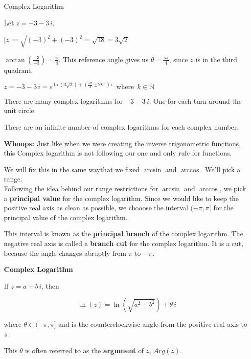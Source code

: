 \documentclass{ximera}
\begin{document}
\begin{example} Complex Logarithm


Let $z = -3 - 3 \, i$.


$|z| = \sqrt{(-3)^2 + (-3)^2} =  \sqrt{18} = 3 \sqrt{2}$


$\arctan\left(\frac{-3}{-3}\right) = \frac{\pi}{4}$.  This reference angle gives us $\theta = \frac{5 \pi}{4}$, since $z$ is in the third quadrant.




$z = -3 - 3 \, i =  e^{\ln(3 \sqrt{2}) + \left( \tfrac{5 \pi}{4} \pm 2 k \pi \right) \, i}     \, \text{ where } \, k \in \mathbb{N}  $


There are many complex logarithms for $-3 - 3 \, i$. One for each turn around the unit circle.



\end{example}




There are an infinite number of complex logarithms for each complex number.



\textbf{\textcolor{red!80!black}{Whoops: }}   Just like when we were creating the inverse trigonometric functions, this Complex logarithm is not following our one and only rule for functions.  

We will fix this in the same waythat we fixed $\arcsin$ and $\arccos$.  We'll pick a range. \\





Following the idea behind our range restrictions for $\arcsin$ and $\arccos$, we pick a \textbf{principal value} for the complex logarithm. Since we would like to keep the positive real axis as clean as possible, we chooose the interval $(-\pi, \pi]$ for the principal value of the complex logarithm.

This interval is known as the \textbf{principal branch} of the complex logarithm.  The negative real axis is called a \textbf{branch cut} for the complex logarithm. It is a cut, because the angle changes abruptly from $\pi$ to $-\pi$.





\begin{definition}   \textbf{\textcolor{green!50!black}{Complex Logarithm}}
 
If $z = a + b \, i$, then 

\[   \ln(z) = \ln(\sqrt{a^2 + b^2}) + \theta \, i       \]



where $\theta \in (-\pi, \pi]$ and is the counterclockwise angle from the positive real axis to $z$.



This $\theta$ is often referred to as the \textbf{argument} of $z$, $Arg(z)$.



\end{definition}
\end{document}
